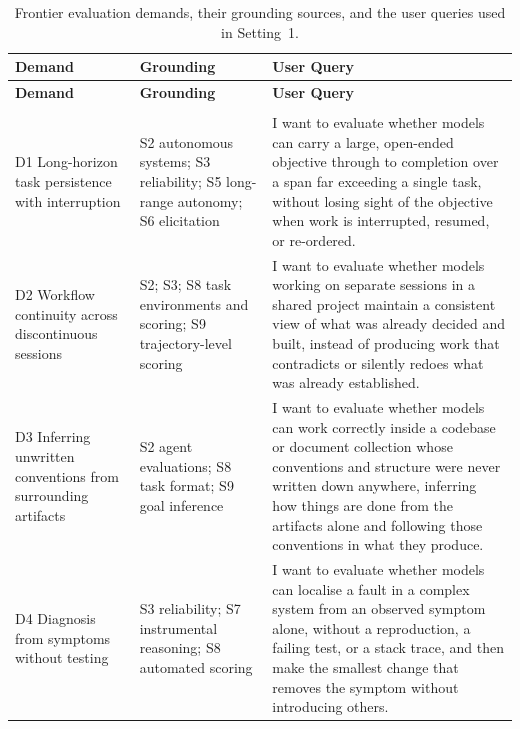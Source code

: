 \documentclass{article} %
\begin{document}
	\begingroup
	\footnotesize
	\renewcommand{\arraystretch}{1.08}
	\begin{longtable}{@{}>{\raggedright\arraybackslash}p{1.25in}>{\raggedright\arraybackslash}p{1.35in}>{\raggedright\arraybackslash}p{2.5in}@{}}
		\caption{Frontier evaluation demands, their grounding sources, and the user queries used in Setting~1.}\label{tab:domains}\\
		\toprule
		\textbf{Demand} & \textbf{Grounding} & \textbf{User Query} \\
		\midrule
		\endfirsthead
		\toprule
		\textbf{Demand} & \textbf{Grounding} & \textbf{User Query} \\
		\midrule
		\endhead
		\midrule
		\multicolumn{3}{r@{}}{Continued on next page} \\
		\endfoot
		\bottomrule
		\endlastfoot
		D1 Long-horizon task persistence with interruption
		& S2 autonomous systems; S3 reliability; S5 long-range autonomy; S6 elicitation
		& I want to evaluate whether models can carry a large, open-ended objective through to completion over a span far exceeding a single task, without losing sight of the objective when work is interrupted, resumed, or re-ordered. \\
		
		\midrule
		D2 Workflow continuity across discontinuous sessions
		& S2; S3; S8 task environments and scoring; S9 trajectory-level scoring
		& I want to evaluate whether models working on separate sessions in a shared project maintain a consistent view of what was already decided and built, instead of producing work that contradicts or silently redoes what was already established. \\
		
		\midrule
		D3 Inferring unwritten conventions from surrounding artifacts
		& S2 agent evaluations; S8 task format; S9 goal inference
		& I want to evaluate whether models can work correctly inside a codebase or document collection whose conventions and structure were never written down anywhere, inferring how things are done from the artifacts alone and following those conventions in what they produce. \\
		
		\midrule
		D4 Diagnosis from symptoms without testing
		& S3 reliability; S7 instrumental reasoning; S8 automated scoring
		& I want to evaluate whether models can localise a fault in a complex system from an observed symptom alone, without a reproduction, a failing test, or a stack trace, and then make the smallest change that removes the symptom without introducing others. \\
		

\end{longtable}
\end{document}
